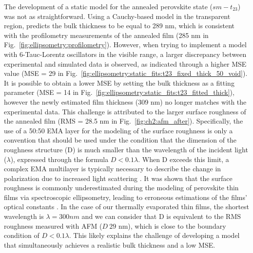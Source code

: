  
The development of a static model for the annealed perovskite state ($sm-t_{\text{23}}$) was not as straightforward. Using a Cauchy-based model in the transparent region, predicts the bulk thickness to be equal to 289 nm, which is consistent with the profilometry measurements of the annealed film (285 nm in Fig.~\ref{fig:ellipsometry:profilometry}). However, when trying to implement a model with 6-Tauc-Lorentz oscillators in the visible range, a larger discrepancy between experimental and simulated data is observed, as indicated through a higher MSE value (MSE = 29 in Fig.~\ref{fig:ellipsometry:static_fits:t23_fixed_thick_50_void}). It is possible to obtain a lower MSE by setting the bulk thickness as a fitting parameter (MSE = 14 in Fig.~\ref{fig:ellipsometry:static_fits:t23_fitted_thick}), however the newly estimated film thickness (309 nm) no longer matches with the experimental data. This challenge is attributed to the larger surface roughness of the annealed film (RMS = 28.5 nm in Fig.~\ref{fig:ch2:afm_after}). Specifically, the use of a 50:50 EMA layer for the modeling of the surface roughness is only a convention that should be used under the condition that the dimension of the roughness structure (D) is much smaller than the wavelength of the incident light ($\lambda$), expressed through the formula $D<0.1\lambda$. When D exceeds this limit, a complex EMA multilayer is typically necessary to describe the change in polarization due to increased light scattering \cite{Akagawa2011High-precisionEllipsometry}. It was shown that the surface roughness is commonly underestimated during the modeling of perovskite thin films via spectroscopic ellipsometry, leading to erroneous estimations of the films' optical constants \cite{Fujiwara2017DeterminationMaterials}. In the case of our thermally evaporated thin films, the shortest wavelength is $\lambda=300 nm$ and we can consider that D is equivalent to the RMS roughness measured with AFM ($D ~ 29$ nm), which is close to the boundary condition of $D<0.1\lambda$. This likely explains the challenge of developing a model that simultaneously achieves a realistic bulk thickness and a low MSE. 



